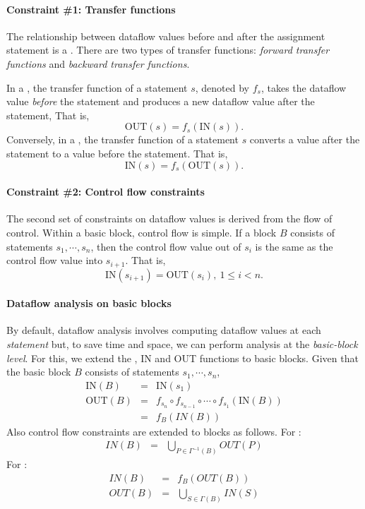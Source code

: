\documentclass{memo}
\begin{document}
\paragraph{Constraint \#1: Transfer functions}
The relationship between dataflow values before and after the assignment
statement is a . There are two types of transfer
functions: {\em forward transfer functions} and {\em backward transfer
  functions}. 

In a , the transfer function of a statement $s$,
denoted by $f_s$, takes the dataflow value {\em before\/} the statement and
produces a new dataflow value after the statement, That is,
   \[ \mbox{OUT}(s) = f_s(\mbox{IN}(s)). \]
Conversely, in a , the transfer function of a
statement $s$ converts a value after the statement to a value before the
statement. That is,
   \[ \mbox{IN}(s) = f_s(\mbox{OUT}(s)). \]

\paragraph{Constraint \#2: Control flow constraints}
The second set of constraints on dataflow values is derived from the flow of
control. Within a basic block, control flow is simple. If a block $B$ consists
of statements $s_1, \cdots, s_n$, then the control flow value out of $s_i$ is
the same as the control flow value into $s_{i+1}$. That is,
   \[ \mbox{IN}(s_{i+1}) =\mbox{OUT}(s_i), \ 1 \le i < n. \]


\paragraph{Dataflow analysis on basic blocks}
By default, dataflow analysis involves computing dataflow values at each
{\em statement\/} but, to save time and space, we can perform analysis at the
{\em basic-block level\/}. For this, we extend the , IN 
and OUT functions to basic blocks. 
Given that the basic block $B$ consists of statements $s_1, \cdots, s_n$,
\begin{eqnarray*}
  \mbox{IN}(B) & = & \mbox{IN}(s_1) \\
  \mbox{OUT}(B) & = & f_{s_n} \circ f_{s_{n-1}} \circ \cdots \circ f_{s_1}
  (\mbox{IN}(B)) \\
                & = & f_B(IN(B))
\end{eqnarray*}
Also control flow constraints are extended to blocks as follows.
For :
\begin{eqnarray*}
  IN(B) & = & \bigcup_{P \in \Gamma^{-1}(B)} OUT(P)
\end{eqnarray*}
For :
\begin{eqnarray*}
  IN(B) & = & f_B(OUT(B)) \\
  OUT(B) & = & \bigcup_{S \in \Gamma(B)} IN(S)
\end{eqnarray*}
\end{document}
